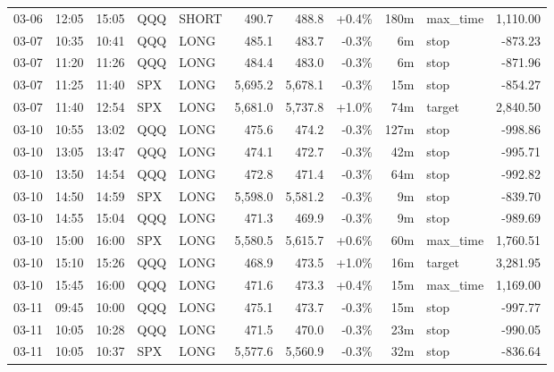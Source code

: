 \documentclass[11pt,a4paper,twoside]{article}
\begin{document}
\begin{center}
\begin{longtable}{>{\color{txtmain}}l l l l l r r r r >{\color{txtmain}}l r}
03-06 & 12:05 & 15:05 & QQQ & SHORT & 490.7 & 488.8 & \textcolor{wingreen}{+0.4\%} & 180m & max\_time & \textcolor{wingreen}{1,110.00} \\
03-07 & 10:35 & 10:41 & QQQ & LONG & 485.1 & 483.7 & \textcolor{lossred}{-0.3\%} & 6m & stop & \textcolor{lossred}{-873.23} \\
03-07 & 11:20 & 11:26 & QQQ & LONG & 484.4 & 483.0 & \textcolor{lossred}{-0.3\%} & 6m & stop & \textcolor{lossred}{-871.96} \\
03-07 & 11:25 & 11:40 & SPX & LONG & 5,695.2 & 5,678.1 & \textcolor{lossred}{-0.3\%} & 15m & stop & \textcolor{lossred}{-854.27} \\
03-07 & 11:40 & 12:54 & SPX & LONG & 5,681.0 & 5,737.8 & \textcolor{wingreen}{+1.0\%} & 74m & target & \textcolor{wingreen}{2,840.50} \\
03-10 & 10:55 & 13:02 & QQQ & LONG & 475.6 & 474.2 & \textcolor{lossred}{-0.3\%} & 127m & stop & \textcolor{lossred}{-998.86} \\
03-10 & 13:05 & 13:47 & QQQ & LONG & 474.1 & 472.7 & \textcolor{lossred}{-0.3\%} & 42m & stop & \textcolor{lossred}{-995.71} \\
03-10 & 13:50 & 14:54 & QQQ & LONG & 472.8 & 471.4 & \textcolor{lossred}{-0.3\%} & 64m & stop & \textcolor{lossred}{-992.82} \\
03-10 & 14:50 & 14:59 & SPX & LONG & 5,598.0 & 5,581.2 & \textcolor{lossred}{-0.3\%} & 9m & stop & \textcolor{lossred}{-839.70} \\
03-10 & 14:55 & 15:04 & QQQ & LONG & 471.3 & 469.9 & \textcolor{lossred}{-0.3\%} & 9m & stop & \textcolor{lossred}{-989.69} \\
03-10 & 15:00 & 16:00 & SPX & LONG & 5,580.5 & 5,615.7 & \textcolor{wingreen}{+0.6\%} & 60m & max\_time & \textcolor{wingreen}{1,760.51} \\
03-10 & 15:10 & 15:26 & QQQ & LONG & 468.9 & 473.5 & \textcolor{wingreen}{+1.0\%} & 16m & target & \textcolor{wingreen}{3,281.95} \\
03-10 & 15:45 & 16:00 & QQQ & LONG & 471.6 & 473.3 & \textcolor{wingreen}{+0.4\%} & 15m & max\_time & \textcolor{wingreen}{1,169.00} \\
03-11 & 09:45 & 10:00 & QQQ & LONG & 475.1 & 473.7 & \textcolor{lossred}{-0.3\%} & 15m & stop & \textcolor{lossred}{-997.77} \\
03-11 & 10:05 & 10:28 & QQQ & LONG & 471.5 & 470.0 & \textcolor{lossred}{-0.3\%} & 23m & stop & \textcolor{lossred}{-990.05} \\
03-11 & 10:05 & 10:37 & SPX & LONG & 5,577.6 & 5,560.9 & \textcolor{lossred}{-0.3\%} & 32m & stop & \textcolor{lossred}{-836.64} \\

\end{longtable}
\end{center}
\end{document}
